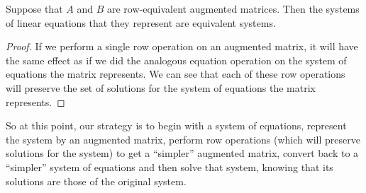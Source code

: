 \documentclass{ximera}
\begin{document}
\begin{theorem}
  Suppose that $A$ and $B$ are row-equivalent augmented matrices.
  Then the systems of linear equations that they represent are
  equivalent systems.
\end{theorem}

\begin{proof}
  If we perform a single row operation on an augmented matrix, it will
  have the same effect as if we did the analogous equation operation
  on the system of equations the matrix represents.  We can see that
  each of these row operations will preserve the set of solutions for
  the system of equations the matrix represents.
\end{proof}

So at this point, our strategy is to begin with a system of equations,
represent the system by an augmented matrix, perform row operations
(which will preserve solutions for the system) to get a ``simpler''
augmented matrix, convert back to a ``simpler'' system of equations
and then solve that system, knowing that its solutions are those of
the original system.
\end{document}
